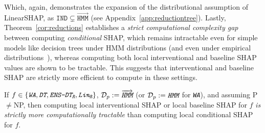 Which, again, demonstrates the expansion of the distributional assumption of LinearSHAP, as $\texttt{IND}\subsetneq \overrightarrow{\texttt{HMM}}$ (see Appendix~\ref{app:reductiontree}). 
Lastly, Theorem~\ref{cor:reductions} establishes a \emph{strict computational complexity gap} between computing \emph{conditional} SHAP, which remains intractable even for simple models like decision trees under HMM distributions (and even under empirical distributions~\citep{vander21}), whereas computing both local interventional and baseline SHAP values are shown to be tractable. This suggests that interventional and baseline SHAP are strictly more efficient to compute in these settings.


\begin{corollary}
    If $f\in\{\emph{\texttt{WA}},\emph{\texttt{DT}},\emph{\texttt{ENS-DT}}_{\emph{\texttt{R}}},\emph{\texttt{Lin}}_{\emph{\texttt{R}}}\}$, $\mathcal{D}_p:=\overrightarrow{\emph{\texttt{\text{HMM}}}}$ (or $\mathcal{D}_p:=\emph{\texttt{HMM}}$ for \emph{\texttt{WA}}), and assuming P$\neq$NP, then computing local interventional SHAP or local baseline SHAP for $f$ \emph{is strictly more computationally tractable} than computing local conditional SHAP for $f$.
\end{corollary}


